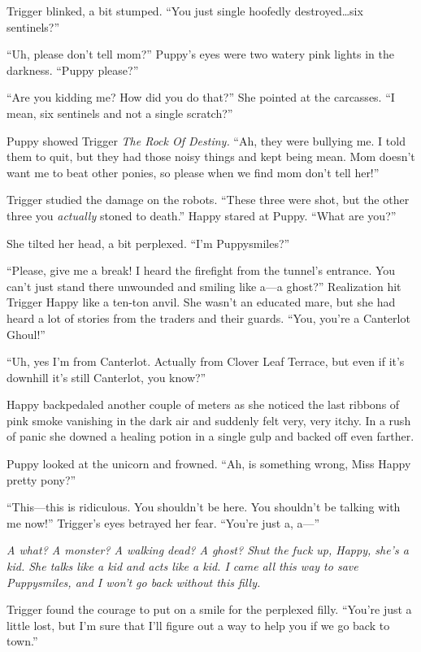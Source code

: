 Trigger blinked, a bit stumped. ``You just single hoofedly destroyed\dots six sentinels?''

``Uh, please don't tell mom?'' Puppy's eyes were two watery pink lights in the darkness. ``Puppy please?''

``Are you kidding me? How did you do that?'' She pointed at the carcasses. ``I mean, six sentinels and not a single scratch?''

Puppy showed Trigger \emph{The Rock Of Destiny.} ``Ah, they were bullying me. I told them to quit, but they had those noisy things and kept being mean. Mom doesn't want me to beat other ponies, so please when we find mom don't tell her!''

Trigger studied the damage on the robots. ``These three were shot, but the other three you \emph{actually} stoned to death.'' Happy stared at Puppy. ``What are you?''

She tilted her head, a bit perplexed. ``I'm Puppysmiles?''

``Please, give me a break! I heard the firefight from the tunnel's entrance. You can't just stand there unwounded and smiling like a---a ghost?'' Realization hit Trigger Happy like a ten-ton anvil. She wasn't an educated mare, but she had heard a lot of stories from the traders and their guards. ``You, you're a Canterlot Ghoul!''

``Uh, yes I'm from Canterlot. Actually from Clover Leaf Terrace, but even if it's downhill it's still Canterlot, you know?''

Happy backpedaled another couple of meters as she noticed the last ribbons of pink smoke vanishing in the dark air and suddenly felt very, very itchy. In a rush of panic she downed a healing potion in a single gulp and backed off even farther.

Puppy looked at the unicorn and frowned. ``Ah, is something wrong, Miss Happy pretty pony?''

``This---this is ridiculous. You shouldn't be here. You shouldn't be talking with me now!'' Trigger's eyes betrayed her fear. ``You're just a, a---''

\emph{A what? A monster? A walking dead? A ghost? Shut the fuck up, Happy, she's a kid. She talks like a kid and acts like a kid. I came all this way to save Puppysmiles, and I won't go back without this filly.}

Trigger found the courage to put on a smile for the perplexed filly. ``You're just a little lost, but I'm sure that I'll figure out a way to help you if we go back to town.''

